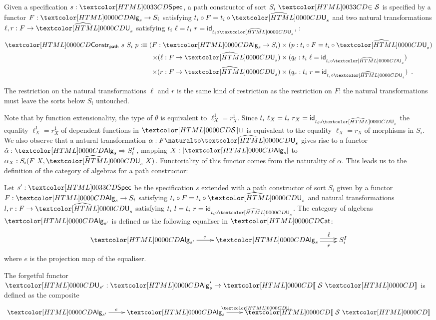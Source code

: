 \begin{definition}
  \label{data-path-constructor}

  Given a specification $s : \specty$, a path constructor of sort
  $\sortsin{S_i}{\Ss}$ is specified by a functor $F : \Alg_s \to S_i$
  satisfying $t_i \circ F = t_i \circ \extendfunc{\Und}_s$ and two natural
  transformations $\ell, r : F \to \extendfunc{\Und}_s$ satisfying
  $t_i\ \ell = t_i\ r = \id_{t_i \circ \extendfunc{\Und}_s}$, \ie:
\begin{align*}
  \Constr_{\ident{path}}\ s\ S_i\ p \ddefeq (F : \Alg_s \to S_i) &\times (p : t_i \circ F = t_i \circ \extendfunc{\Und}_s) \\ 
  \times (\ell : F \to \extendfunc{\Und}_s) &\times (q_\ell : t_i\ \ell = \id_{t_i \circ \extendfunc{\Und}_s}) \\ 
  \times (r : F \to \extendfunc{\Und}_s) &\times (q_r : t_i\ r = \id_{t_i \circ \extendfunc{\Und}_s}) \enspace .
\end{align*}
\end{definition}

The restriction on the natural transformations $\ell$ and $r$ is the
same kind of restriction as the restriction on $F$: the natural
transformations must leave the sorts below $S_i$ untouched.

Note that by function extensionality, the type of $\theta$ is
equivalent to $\ell^1_X = r^1_X$. Since
$t_i\ \ell_X = t_i\ r_X = \id_{t_i \circ \extendfunc{\Und}_s}$ the
equality $\ell^1_X = r^1_X$ of dependent functions in $\SET$ is
equivalent to the equality $\ell_X = r_X$ of morphisms in $S_i$. We
also observe that a natural transformation
$\alpha : \Nat{F}{\extendfunc{\Und}_s}$ gives rise to a functor
$\hat{\alpha} : \Func{\Alg_s}{S_i^I}$, mapping $X : | \Alg_s |$ to
$\alpha_X : S_i(F\ X,\extendfunc{\Und}_s\ X)$. Functoriality of this
functor comes from the naturality of $\alpha$. This leads us to the
definition of the category of algebras for a path constructor:

\begin{definition}
  \label{algebras-path-constructor}

  Let $s' : \specty$ be the specification
  $s$ extended with a path constructor of sort
  $S_i$ given by a functor $F : \Alg_s \to S_i$ satisfying $t_i \circ
  F = t_i \circ \extendfunc{\Und}_s$ and natural transformations $l, r : F \to
  \extendfunc{\Und}_s$ satisfying $t_i\ l = t_i\ r = \id_{t_i \circ
    \extendfunc{\Und}_s}$. The category of algebras
  $\Alg_{s'}$ is defined as the following equaliser in $\Cat$:
  \[
  \xymatrix{
    \Alg_{s'} \ar[r]^{e} &\Alg_s \ar@<-.5ex>[r]_-{\hat{r}} \ar@<.5ex>[r]^-{\hat{\ell}} &S_i^I
  }
  \]
  where $e$ is the projection map of the equaliser.

The forgetful functor $\Und_{s'} : \Alg_s' \to \SortCat{\Ss}$ is defined as the composite
\[
\xymatrix{
    \Alg_{s'} \ar[r]^{e} &\Alg_s \ar[r]^{\Und_s} &\SortCat{\Ss}
}
\]
\end{definition}

